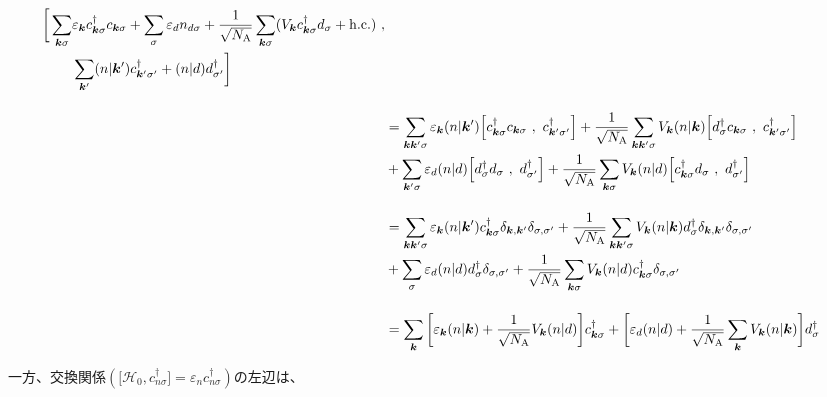 \documentclass[a4j]{jarticle}
\begin{document}
\begin{align}
	\begin{split}
		\bigg[
			\sum_{\bm{k}\sigma}
		 & \varepsilon_{\bm{k}}
			c^{\dagger}_{\bm{k} \sigma}
			c_{\bm{k} \sigma}
			+
			\sum_{\sigma}
			\varepsilon_{d}
			n_{d \sigma}
			+
			\frac{1}{\sqrt{N_{\rm A}}}
			\sum_{\bm{k}\sigma}
			(
			V_{\bm{k}}
			c_{\bm{k}\sigma}^{\dagger}
			d_{\sigma}
			+
			{\rm h.c.}
			)
			\
			,
		\\
		 & \sum_{\bm{k}'}
			( n | \bm{k}' )
			c^{\dagger}_{\bm{k}' \sigma'}
			+
			( n | d )
			d^{\dagger}_{\sigma'}
			\bigg]
	\end{split}
	\nonumber \\[4mm] &=
	\sum_{\bm{k} \bm{k}' \sigma}
	\varepsilon_{\bm{k}}
	( n | \bm{k}' )
	\Big[
		c^{\dagger}_{\bm{k} \sigma}
		c_{\bm{k} \sigma}
		\
		,
		\
		c^{\dagger}_{\bm{k}' \sigma'}
		\Big]
	+
	\frac{1}{\sqrt{N_{\rm A}}}
	\sum_{\bm{k} \bm{k}' \sigma}
	V_{\bm{k}}
	(n | \bm{k})
	\Big[
		d_{\sigma}^{\dagger}
		c_{\bm{k}\sigma}
		\
		,
		\
		c^{\dagger}_{\bm{k}' \sigma'}
		\Big]
	\nonumber \\ &
	+
	\sum_{\bm{k}' \sigma}
	\varepsilon_{d}
	( n | d )
	\Big[
		d^{\dagger}_{\sigma}
		d_{\sigma}
		\
		,
		\
		d^{\dagger}_{\sigma'}
		\Big]
	+
	\frac{1}{\sqrt{N_{\rm A}}}
	\sum_{\bm{k} \sigma}
	V_{\bm{k}} (n | d)
	\Big[
		c_{\bm{k}\sigma}^{\dagger}
		d_{\sigma}
		\
		,
		\
		d^{\dagger}_{\sigma'}
		\Big]
	\nonumber \\[4mm] &=
	\sum_{\bm{k} \bm{k}' \sigma}
	\varepsilon_{\bm{k}}
	( n | \bm{k}' )
	c^{\dagger}_{\bm{k} \sigma}
	\delta_{\bm{k}, \bm{k}'}
	\delta_{\sigma, \sigma'}
	+
	\frac{1}{\sqrt{N_{\rm A}}}
	\sum_{\bm{k} \bm{k}' \sigma}
	V_{\bm{k}} (n | \bm{k})
	d_{\sigma}^{\dagger}
	\delta_{\bm{k}, \bm{k}'}
	\delta_{\sigma, \sigma'}
	\nonumber \\ &
	+
	\sum_{\sigma}
	\varepsilon_{d}
	( n | d )
	d^{\dagger}_{\sigma}
	\delta_{\sigma, \sigma'}
	+
	\frac{1}{\sqrt{N_{\rm A}}}
	\sum_{\bm{k} \sigma}
	V_{\bm{k}} (n | d)
	c_{\bm{k}\sigma}^{\dagger}
	\delta_{\sigma, \sigma'}
	\nonumber \\[4mm] &=
	\sum_{\bm{k}}
	\bigg[
		\varepsilon_{\bm{k}}
		( n | \bm{k} )
		+
		\frac{1}{\sqrt{N_{\rm A}}}
		V_{\bm{k}} (n | d)
		\bigg]
	c^{\dagger}_{\bm{k} \sigma}
	+
	\bigg[
		\varepsilon_{d}
		( n | d )
		+
		\frac{1}{\sqrt{N_{\rm A}}}
		\sum_{\bm{k}}
		V_{\bm{k}} (n | \bm{k})
		\bigg]
	d^{\dagger}_{\sigma}
\end{align}

一方、交換関係$( \displaystyle \big[ \mathcal{H}_{0} , c^{\dagger}_{n \sigma} \big] = \varepsilon_{n} c^{\dagger}_{n \sigma} )$の左辺は、
\end{document}
